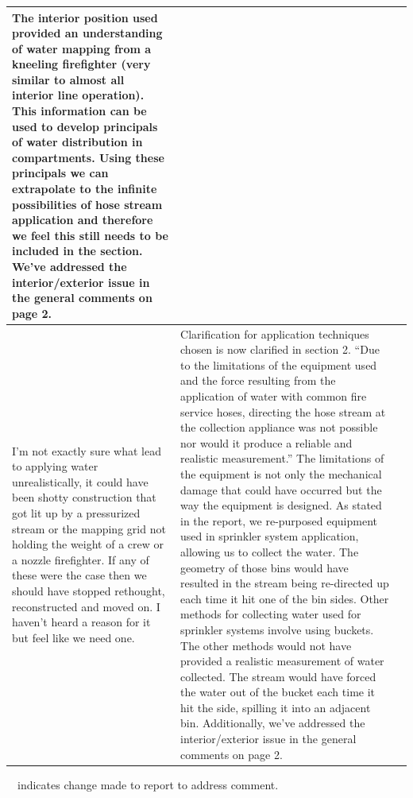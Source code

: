 \documentclass[12pt,oneside]{book}
\begin{document}
\begin{landscape}
\begin{longtable}{|L{4in}|L{3.75in}|c|}
		The interior position used provided an understanding of water mapping from a kneeling firefighter (very similar to almost all interior line operation). This information can be used to develop principals of water distribution in compartments.  Using these principals we can extrapolate to the infinite possibilities of hose stream application and therefore we feel this still needs to be included in the section. We've addressed the interior/exterior issue in the general comments on page 2.  & \\
		\hline
		I’m not exactly sure what lead to applying water unrealistically, it could have been shotty construction that got lit up by a pressurized stream or the mapping grid not holding the weight of a crew or a nozzle firefighter. If any of these were the case then we should have stopped rethought, reconstructed and moved on. I haven’t heard a reason for it but feel like we need one. &
		Clarification for application techniques chosen is now clarified in section 2. ``Due to the limitations of the equipment used and the force resulting from the application of water with common fire service hoses, directing the hose stream at the collection appliance was not possible nor would it produce a reliable and realistic measurement.'' The limitations of the equipment is not only the mechanical damage that could have occurred but the way the equipment is designed. As stated in the report, we re-purposed equipment used in sprinkler system application, allowing us to collect the water. The geometry of those bins would have resulted in the stream being re-directed up each time it hit one of the bin sides. Other methods for collecting water used for sprinkler systems involve using buckets. The other methods would not have provided a realistic measurement of water collected. The stream would have forced the water out of the bucket each time it hit the side, spilling it into an adjacent bin. Additionally, we've addressed the interior/exterior issue in the general comments on page 2.& \\

		\hline
\end{longtable}
\checkmark~~indicates change made to report to address comment.


\end{landscape}

\pagestyle{plain}

\end{document}
